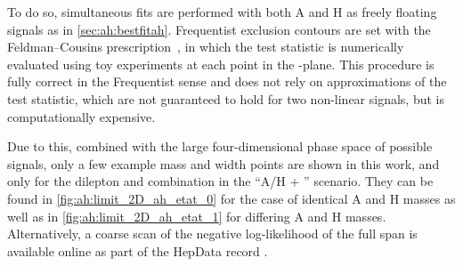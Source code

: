 To do so, simultaneous fits are performed with both A and H as freely floating signals as in \cref{sec:ah:bestfitah}. Frequentist exclusion contours are set with the Feldman--Cousins prescription~\cite{Feldman:1997qc,Cousins:1991qz}, in which the test statistic is numerically evaluated using toy experiments at each point in the \gAtt-\gHtt plane. This procedure is fully correct in the Frequentist sense and does not rely on approximations of the test statistic, which are not guaranteed to hold for two non-linear signals, but is computationally expensive.

Due to this, combined with the large four-dimensional phase space of possible signals, only a few example mass and width points are shown in this work, and only for the dilepton and \ljets combination in the ``A/H + \etat'' scenario. They can be found in \cref{fig:ah:limit_2D_ah_etat_0} for the case of identical A and H masses as well as in \cref{fig:ah:limit_2D_ah_etat_1} for differing A and H masses. Alternatively, a coarse scan of the negative log-likelihood of the full span is available online as part of the HepData record .


